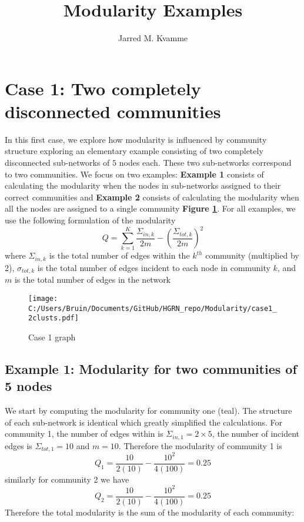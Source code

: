 \documentclass[a4paper,12pt]{article}
\begin{document}
	\begin{titlepage}
		\title{Modularity Examples}
		\author[1]{Jarred M. Kvamme}
		\maketitle
	\end{titlepage}
	
	
	\newpage
	\tableofcontents{}
	\listoftables
	\listoffigures
	\newpage
	
	\section{Case 1: Two completely disconnected communities}
	In this first case, we explore how modularity is influenced by community structure exploring an elementary example consisting of two completely disconnected sub-networks of $5$ nodes each. These two sub-networks correspond to two communities. We focus on two examples: \textbf{Example 1} consists of calculating the modularity when the nodes in sub-networks assigned to their correct communities and \textbf{Example 2} consists of calculating the modularity when all the nodes are assigned to a single community \textbf{Figure \ref{fig:case1}}. For all examples, we use the following formulation of the modularity 
	\[Q = \sum_{k=1}^K\frac{\Sigma_{in,k}}{2m} - \left(\frac{\Sigma_{tot,k}}{2m}\right)^2 \]
	where $\Sigma_{in,k}$ is the total number of edges within the $k^{th}$ community (multiplied by 2), $\sigma_{tot,k}$ is the total number of edges incident to each node in community $k$, and $m$ is the total number of edges in the network
	\begin{figure}[H]
		\centering
		\caption{Case 1 graph}
		\texttt{[image: C:/Users/Bruin/Documents/GitHub/HGRN\_repo/Modularity/case1\_2clusts.pdf]}
		\label{fig:case1}
	\end{figure}
	\subsection*{Example 1: Modularity for two communities of 5 nodes}
	We start by computing the modularity for community one (teal). The structure of each sub-network is identical which greatly simplified the calculations. For community 1, the number of edges within is $\Sigma_{in,1} = 2\times5$, the number of incident edges is $\Sigma_{tot,1} = 10$ and $m = 10$. Therefore the modularity of community 1 is 
	\[Q_1 = \frac{10}{2(10)} - \frac{10^2}{4(100)} = 0.25\]
	similarly for community 2 we have 
	\[Q_2 = \frac{10}{2(10)} - \frac{10^2}{4(100)} = 0.25\]
	Therefore the total modularity is the sum of the modularity of each community:
	
\end{document}
